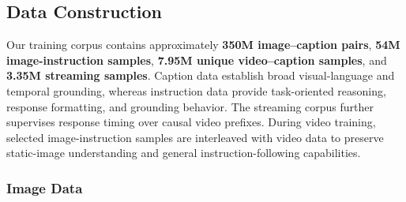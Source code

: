 \subsection{Data Construction}
\label{sec:magevl_data}
Our training corpus contains approximately \textbf{350M image--caption pairs}, \textbf{54M image-instruction samples}, \textbf{7.95M unique video--caption samples}, and \textbf{3.35M streaming samples}. Caption data establish broad visual-language and temporal grounding, whereas instruction data provide task-oriented reasoning, response formatting, and grounding behavior. The streaming corpus further supervises response timing over causal video prefixes. During video training, selected image-instruction samples are interleaved with video data to preserve static-image understanding and general instruction-following capabilities.



\subsubsection{Image Data}
\label{sec:image_data}

